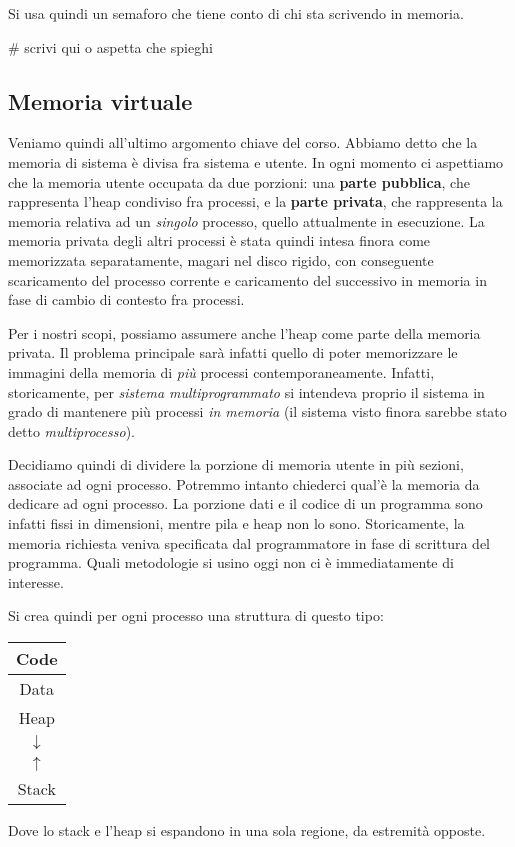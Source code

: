 \documentclass[a4paper,11pt]{article}
\begin{document}
Si usa quindi un semaforo che tiene conto di chi sta scrivendo in memoria.

# scrivi qui o aspetta che spieghi

\subsection{Memoria virtuale}
Veniamo quindi all'ultimo argomento chiave del corso.
Abbiamo detto che la memoria di sistema è divisa fra sistema e utente.
In ogni momento ci aspettiamo che la memoria utente occupata da due porzioni: una \textbf{parte pubblica}, che rappresenta l'heap condiviso fra processi, e  la \textbf{parte privata}, che rappresenta la memoria relativa ad un \textit{singolo} processo, quello attualmente in esecuzione.
La memoria privata degli altri processi è stata quindi intesa finora come memorizzata separatamente, magari nel disco rigido, con conseguente scaricamento del processo corrente e caricamento del successivo in memoria in fase di cambio di contesto fra processi.

Per i nostri scopi, possiamo assumere anche l'heap come parte della memoria privata. Il problema principale sarà infatti quello di poter memorizzare le immagini della memoria di \textit{più} processi contemporaneamente.
Infatti, storicamente, per \textit{sistema multiprogrammato} si intendeva proprio il sistema in grado di mantenere più processi \textit{in memoria} (il sistema visto finora sarebbe stato detto \textit{multiprocesso}).

Decidiamo quindi di dividere la porzione di memoria utente in più sezioni, associate ad ogni processo.
Potremmo intanto chiederci qual'è la memoria da dedicare ad ogni processo.
La porzione dati e il codice di un programma sono infatti fissi in dimensioni, mentre pila e heap non lo sono.
Storicamente, la memoria richiesta veniva specificata dal programmatore in fase di scrittura del programma.
Quali metodologie si usino oggi non ci è immediatamente di interesse.

Si crea quindi per ogni processo una struttura di questo tipo:
\begin{table}[H]
	\center 
	\begin{tabular} { | c | }
		\sffamily Code \\ 
		\hline
		\sffamily Data \\
		\hline
		\sffamily Heap \\ 
		$\downarrow$ \\
		$\uparrow$ \\
		\sffamily Stack
	\end{tabular}
\end{table}
Dove lo stack e l'heap si espandono in una sola regione, da estremità opposte.
\end{document}
